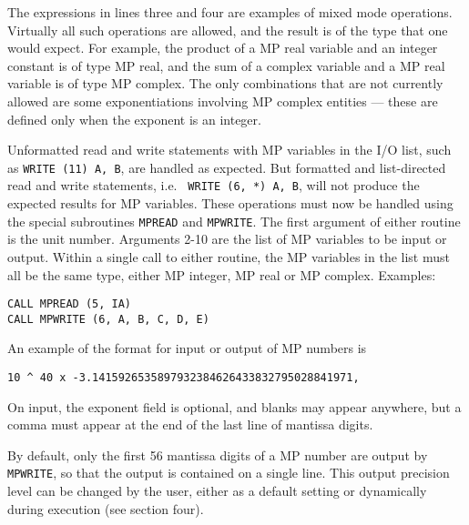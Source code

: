 The expressions in lines three and four are examples of mixed mode
operations.  Virtually all such operations are allowed, and the result
is of the type that one would expect.  For example, the product of a
MP real variable and an integer constant is of type MP real, and the
sum of a complex variable and a MP real variable is of type MP
complex.  The only combinations that are not currently allowed are
some exponentiations involving MP complex entities --- these are
defined only when the exponent is an integer.

Unformatted read and write statements with MP variables in the I/O
list, such as {\tt WRITE (11) A, B}, are handled as expected.  But
formatted and list-directed read and write statements, i.e. {\tt
WRITE (6, *) A, B}, will not produce the expected results for MP
variables.  These operations must now be handled using the special
subroutines {\tt MPREAD} and {\tt MPWRITE}.  The first argument of
either routine is the unit number.  Arguments 2-10 are the list of MP
variables to be input or output.  Within a single call to either
routine, the MP variables in the list must all be the same type,
either MP integer, MP real or MP complex.  Examples:

\begin{tt} \begin{small} \begin{verbatim}
CALL MPREAD (5, IA)
CALL MPWRITE (6, A, B, C, D, E)
\end{verbatim} \end{small} \end{tt}

An example of the format for input or output of MP numbers is

\begin{tt} \begin{small} \begin{verbatim}
10 ^ 40 x -3.1415926535897932384626433832795028841971,
\end{verbatim} \end{small} \end{tt}

\noindent
On input, the exponent field is optional, and blanks may appear
anywhere, but a comma must appear at the end of the last line of
mantissa digits.

By default, only the first 56 mantissa digits of a MP number are
output by {\tt MPWRITE}, so that the output is contained on a single
line.  This output precision level can be changed by the user, either
as a default setting or dynamically during execution (see section
four).

